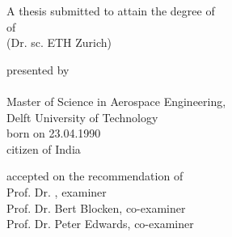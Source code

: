 
\begin{titlepage}

\begin{center}

	\large
	\begingroup
	\endgroup
	
	\hfill
	
	\vfill
	
	\begingroup
	\textbf{\spacedallcaps{\myTitle}}
	\endgroup
	
	\vfill
	
	\vfill
	
	\begingroup
	A thesis submitted to attain the degree of\\
	\vspace{2mm}
	 of \\
	(Dr. sc. ETH Zurich)
	\endgroup
	
	\vfill
	
	\begingroup
	presented by\\
	\vspace{2mm}
	\spacedlowsmallcaps{\myName}\\
	\vspace{8mm}
	Master of Science in Aerospace Engineering, \\
	Delft University of Technology \\
	\vspace{8mm}
	born on 23.04.1990\\
	\vspace{2mm}
	citizen of India
	\endgroup
	
	\vfill
	
	\begingroup
	accepted on the recommendation of\\
	\vspace{2mm}
	Prof. Dr. \myProf, examiner\\            
	Prof. Dr. Bert Blocken, co-examiner\\            	
	Prof. Dr. Peter Edwards, co-examiner
	\endgroup
	
	\vfill
	
	\myTime
	
	\vfill               
	
\end{center}  

\end{titlepage}